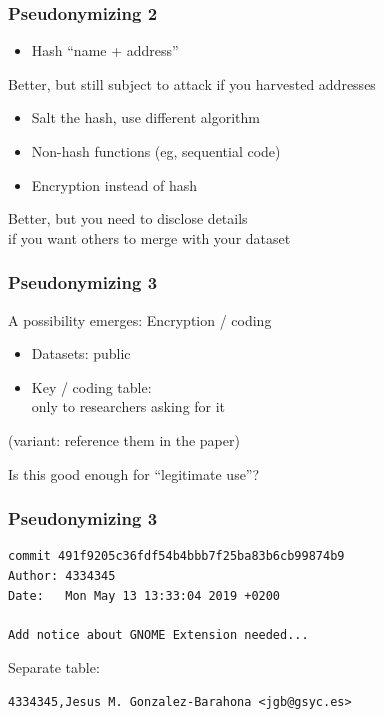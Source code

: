 \documentclass[17pt,aspectratio=169,hyperref={pdfusetitle,colorlinks,allcolors=olive}]{beamer}
\begin{document}
\begin{frame}[fragile]
  \frametitle{Pseudonymizing 2}

  \begin{itemize}
  \item Hash ``name + address'' \\
  \end{itemize}

  Better, but still subject to attack if you harvested addresses

  \begin{itemize}
  \item Salt the hash, use different algorithm \\
  \item Non-hash functions (eg, sequential code)
  \item Encryption instead of hash
  \end{itemize}

  Better, but you need to disclose details \\
  if you want others to merge with your dataset

\end{frame}

\begin{frame}[fragile]
  \frametitle{Pseudonymizing 3}

  A possibility emerges: Encryption / coding \\
    \vspace{.3cm}
    \begin{itemize}
    \item Datasets: public
    \item Key / coding table: \\
      only to researchers asking for it \\
    \end{itemize}

    (variant: reference them in the paper) \\
    \vspace{.3cm}

  Is this good enough for ``legitimate use''? \\
\end{frame}

\begin{frame}[fragile]
  \frametitle{Pseudonymizing 3}

{\small
\begin{verbatim}
commit 491f9205c36fdf54b4bbb7f25ba83b6cb99874b9
Author: 4334345
Date:   Mon May 13 13:33:04 2019 +0200

Add notice about GNOME Extension needed...
\end{verbatim}  
}

Separate table:

{\small
\begin{verbatim}
4334345,Jesus M. Gonzalez-Barahona <jgb@gsyc.es>
\end{verbatim}  
}

\end{frame}
\end{document}
